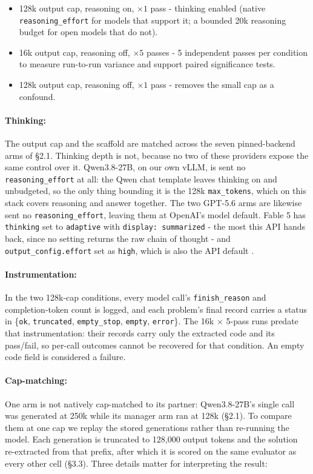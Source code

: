 \documentclass[11pt]{article}
\begin{document}
\begin{itemize}
  \item 128k output cap, reasoning on, $\times1$ pass - thinking enabled (native
  \texttt{reasoning\_effort} for models that support it; a bounded 20k reasoning budget
  for open models that do not).

  \item 16k output cap, reasoning off, $\times5$ passes - 5 independent passes per
  condition to measure run-to-run variance and support paired significance tests.

  \item 128k output cap, reasoning off, $\times1$ pass - removes the small cap as a
  confound.
\end{itemize}

\paragraph{Thinking:}
The output cap and the scaffold are matched across the seven pinned-backend arms of \S2.1.
Thinking depth is not, because no two of these providers expose the same control
over it. Qwen3.8-27B, on our own vLLM, is sent no \texttt{reasoning\_effort} at all: the
Qwen chat template leaves thinking on and unbudgeted, so the only thing bounding it is the
128k \texttt{max\_tokens}, which on this stack covers reasoning and answer together. The two
GPT-5.6 arms are likewise sent no \texttt{reasoning\_effort}, leaving them at OpenAI's model
default. Fable 5 has
\texttt{thinking} set to \texttt{adaptive} with \texttt{display: summarized} - the most this API
hands back, since no setting returns the raw chain of thought - and
\texttt{output\_config.effort} set as \texttt{high}, which is also the API
default \cite{anthropic2026effort}.

\paragraph{Instrumentation:}
In the two 128k-cap conditions, every model call's \texttt{finish\_reason} and
completion-token count is logged, and each problem's final record carries a status in
\{\texttt{ok}, \texttt{truncated}, \texttt{empty\_stop}, \texttt{empty}, \texttt{error}\}.
The 16k $\times$ 5-pass runs predate that instrumentation: their records carry only the
extracted code and its pass/fail, so per-call outcomes cannot be recovered for that
condition. An empty code field is considered a failure.

\paragraph{Cap-matching:}
One arm is not natively cap-matched to its partner: Qwen3.8-27B's single call was generated
at 250k while its manager arm ran at 128k (\S2.1). To compare them at one cap we replay the
stored generations rather than re-running the model. Each generation is truncated to
128,000 output tokens and the solution re-extracted from that prefix, after which it is
scored on the same evaluator as every other cell (\S3.3). Three details matter for
interpreting the result:
\end{document}
